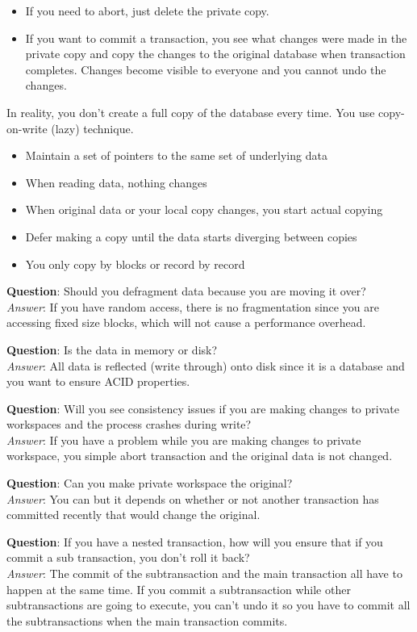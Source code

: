\documentclass[twoside]{article}
\begin{document}
\begin{itemize}
\item{If you need to abort, just delete the private copy.}
\item{If you want to commit a transaction, you see what changes were made in the private copy and copy the changes to the original database when transaction completes. Changes become visible to everyone and you cannot undo the changes.}
\end{itemize}

In reality, you don't create a full copy of the database every time. You use copy-on-write (lazy) technique.

\begin{itemize}
\item{Maintain a set of pointers to the same set of underlying data}
\item{When reading data, nothing changes}
\item{When original data or your local copy changes, you start actual copying}
\item{Defer making a copy until the data starts diverging between copies}
\item{You only copy by blocks or record by record}
\end{itemize}


\textbf{Question}: Should you defragment data because you are moving it over?\\
\emph{Answer}: If you have random access, there is no fragmentation since you are accessing fixed size blocks, which will not cause a performance overhead.

\textbf{Question}: Is the data in memory or disk?\\
\emph{Answer}: All data is reflected (write through) onto disk since it is a database and you want to ensure ACID properties.

\textbf{Question}: Will you see consistency issues if you are making changes to private workspaces and the process crashes during write?\\
\emph{Answer}: If you have a problem while you are making changes to private workspace, you simple abort transaction and the original data is not changed.

\textbf{Question}: Can you make private workspace the original?\\
\emph{Answer}: You can but it depends on whether or not another transaction has committed recently that would change the original.

\textbf{Question}: If you have a nested transaction, how will you ensure that if you commit a sub transaction, you don't roll it back?\\
\emph{Answer}: The commit of the subtransaction and the main transaction all have to happen at the same time. If you commit a subtransaction while other subtransactions are going to execute, you can't undo it so you have to commit all the subtransactions when the main transaction commits.
\end{document}
